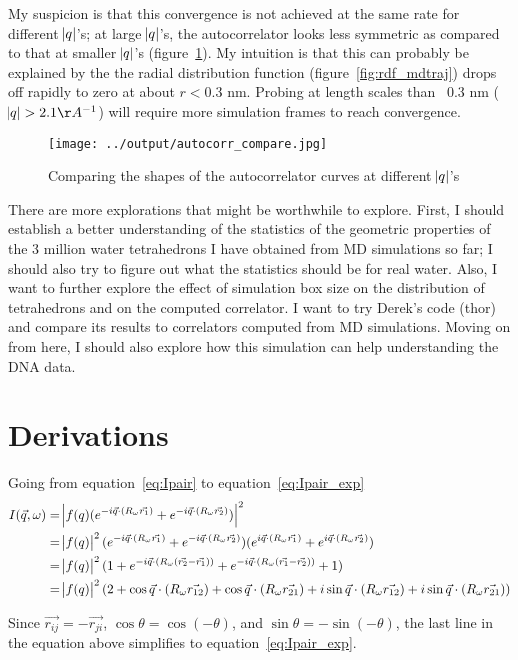 \documentclass[20pt]{article}
\begin{document}
My suspicion is that this convergence is not achieved at the same rate for different $\abs{q}$'s; at large $\abs{q}$'s, the autocorrelator looks less symmetric as compared to that at smaller $\abs{q}$'s (figure~\ref{fig:autocorr_compare}). My intuition is that this can probably be explained by the the radial distribution function (figure~\ref{fig:rdf_mdtraj}) drops off rapidly to zero at about $r<0.3$ nm. Probing at length scales than ~0.3 nm ($\abs{q}>2.1 \AA^{-1}$) will require more simulation frames to reach convergence.

\begin{figure}[!h]
  \centering
    \texttt{[image: ../output/autocorr\_compare.jpg]}
     \caption{Comparing the shapes of the autocorrelator curves at different $\abs{q}$'s} \label{fig:autocorr_compare}
\end{figure}

There are more explorations that might be worthwhile to explore. First, I should establish a better understanding of the statistics of the geometric properties of the 3 million water tetrahedrons I have obtained from MD simulations so far; I should also try to figure out what the statistics should be for real water. Also, I want to further explore the effect of simulation box size on the distribution of tetrahedrons and on the computed correlator. I want to try Derek's code (thor) and compare its results to correlators computed from MD simulations. Moving on from here, I should also explore how this simulation can help understanding the DNA data.

\section{Derivations}
Going from equation~\ref{eq:Ipair} to equation~\ref{eq:Ipair_exp}
\begin{align}
I(\vec{q},\omega) &= \abs{f(q) (e^{-i \vec{q} \cdot (R_{\omega} \vec{r_1})}+e^{-i \vec{q} \cdot (R_{\omega} \vec{r_2})})}^2 \nonumber \\ 
&=\abs{f(q)}^2 (e^{-i \vec{q} \cdot (R_{\omega} \vec{r_1})}+e^{-i \vec{q} \cdot (R_{\omega} \vec{r_2})})(e^{i \vec{q} \cdot (R_{\omega} \vec{r_1})}+e^{i \vec{q} \cdot (R_{\omega} \vec{r_2})}) \nonumber\\
&=\abs{f(q)}^2(1+e^{-i \vec{q} \cdot (R_{\omega} (\vec{r_2}-\vec{r_1}))}+e^{-i \vec{q} \cdot (R_{\omega} (\vec{r_1}-\vec{r_2}))}+1)\nonumber \\
&=\abs{f(q)}^2(2+\cos{\vec{q} \cdot (R_{\omega} \vec{r_{12}}})+\cos{\vec{q} \cdot (R_{\omega} \vec{r_{21}}})+i\sin{\vec{q} \cdot (R_{\omega} \vec{r_{12}}})+i\sin{\vec{q} \cdot (R_{\omega} \vec{r_{21}}})) \nonumber
\end{align}

Since $\vec{r_{ij}} = -\vec{r_{ji}}$, $\cos{\theta}=\cos{(-\theta)}$, and $\sin{\theta}=-\sin{(-\theta)}$, the last line in the equation above simplifies to equation~\ref{eq:Ipair_exp}.
\end{document}

